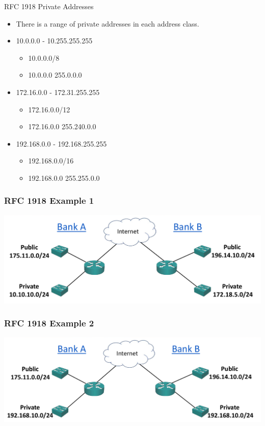 \documentclass[pdflatex,compress]{beamer}
\begin{document}
\begin{frame}{RFC 1918 Private Addresses}
	\begin{itemize}
		\item There is a range of private addresses in each address class.
		\item 10.0.0.0 - 10.255.255.255
		\begin{itemize}
			\item 10.0.0.0/8
			\item 10.0.0.0 255.0.0.0
		\end{itemize}
		\item 172.16.0.0 - 172.31.255.255
		\begin{itemize}
			\item 172.16.0.0/12
			\item 172.16.0.0 255.240.0.0
		\end{itemize}
		\item 192.168.0.0 - 192.168.255.255
		\begin{itemize}
			\item 192.168.0.0/16
			\item 192.168.0.0 255.255.0.0
		\end{itemize}
	\end{itemize}
\end{frame}

\begin{frame}
	\frametitle{RFC 1918 Example 1}
	\begin{center}
		\includegraphics[width=\linewidth]{img/img27}
	\end{center}
\end{frame}

\begin{frame}
	\frametitle{RFC 1918 Example 2}
	\begin{center}
		\includegraphics[width=\linewidth]{img/img28}
	\end{center}
\end{frame}
\end{document}
